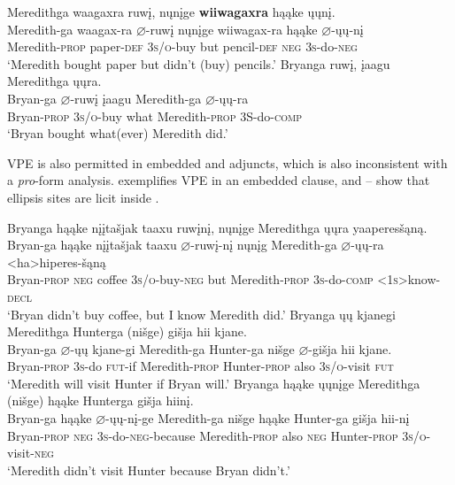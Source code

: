 \documentclass[output=paper]{LSP/langsci}
\begin{document}
\ea\label{ex:jrs:42}
\ea \label{ex:jrs:42a}
\glll Meredithga		waagaxra	ruw\k{i},		n\k{u}n\k{i}ge		\textbf{wiiwagaxra}	hąąke	\k{u}\k{u}n\k{i}.\\
Meredith-ga  waagax-ra	 $\varnothing$-ruw\k{i} 	n\k{u}n\k{i}ge		wiiwagax-ra	hąąke $\varnothing$-\k{u}\k{u}-n\k{i}\\
Meredith-\textsc{prop}	paper-\textsc{def}	\textsc{3s/o}-buy	but pencil-\textsc{def} \textsc{neg}	 \textsc{3s}-do-\textsc{neg}\\
\trans `Meredith bought paper but didn't (buy) pencils.'
\ex \label{ex:jrs:42b}
\glll  Bryanga			ruw\k{i},				\k{i}aagu		Meredithga			\k{u}\k{u}ra.\\
Bryan-ga			$\varnothing$-ruw\k{i}	\k{i}aagu		Meredith-ga	$\varnothing$-\k{u}\k{u}-ra\\
	Bryan-\textsc{prop}	\textsc{3s/o}-buy		what		Meredith-\textsc{prop}		3S-do-\textsc{comp}\\
\trans `Bryan bought what(ever) Meredith did.'
\z
\z

VPE is also permitted in embedded  and adjuncts, which is also inconsistent with a \textit{pro}-form analysis.  exemplifies VPE in an embedded clause, and -- show that ellipsis sites are licit inside  .

\ea\label{ex:jrs:43}
\ea\label{ex:jrs:43a}
\glll Bryanga	hąąke	{n\k{i}\k{i}ta\v{s}jak taaxu}		ruw\k{i}n\k{i},		n\k{u}n\k{i}ge		Meredithga \k{u}\k{u}ra 	yaaperes\v{s}ąną. \\
Bryan-ga hąąke	{n\k{i}\k{i}ta\v{s}jak taaxu} $\varnothing$-ruw\k{i}-n\k{i} n\k{u}n\k{i}g	Meredith-ga $\varnothing$-\k{u}\k{u}-ra	<ha>hiperes-\v{s}ąną \\
Bryan-\textsc{prop}	\textsc{neg}	coffee	 \textsc{3s/o}-buy-\textsc{neg} but	 Meredith-\textsc{prop} \textsc{3s}-do-\textsc{comp}	\textsc{<1s>}know-\textsc{decl} \\
\trans `Bryan didn't buy coffee, but I know Meredith did.'
\ex \label{ex:jrs:43b}
\glll Bryanga	\k{u}\k{u}	kjanegi	Meredithga	Hunterga	(ni\v{s}ge)	 {gi\v{s}ja hii} kjane.\\
Bryan-ga	$\varnothing$-\k{u}\k{u}  kjane-gi	 Meredith-ga	Hunter-ga	ni\v{s}ge  {$\varnothing$-gi\v{s}ja hii} kjane. \\
Bryan-\textsc{prop} \textsc{3s}-do	\textsc{fut}-if	 Meredith-\textsc{prop} Hunter-\textsc{prop}	 also	 \textsc{3s/o}-visit	 \textsc{fut} \\
\trans `Meredith will visit Hunter if Bryan will.'
\ex \label{ex:jrs:43c}
\glll Bryanga			hąąke	\k{u}\k{u}n\k{i}ge	Meredithga		(ni\v{s}ge)		hąąke Hunterga	{gi\v{s}ja hiin\k{i}.}\\
Bryan-ga	hąąke	$\varnothing$-\k{u}\k{u}-n\k{i}-ge	Meredith-ga	 ni\v{s}ge	hąąke  Hunter-ga  {gi\v{s}ja hii-n\k{i}} \\
Bryan-\textsc{prop}	\textsc{neg}	\textsc{3s}-do-\textsc{neg}-because Meredith-\textsc{prop} also	\textsc{neg} Hunter-\textsc{prop} \textsc{3s/o}-visit-\textsc{neg} \\
\trans `Meredith didn't visit Hunter because Bryan didn't.'
\z
\z
\end{document}
